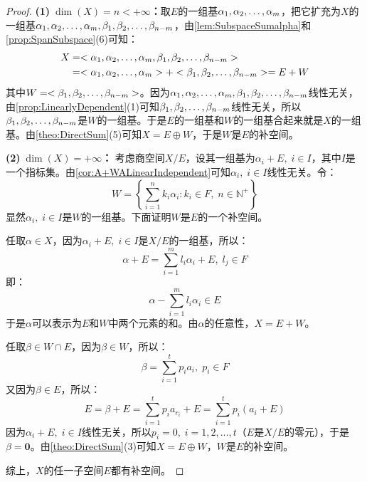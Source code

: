 \begin{proof}
	\textbf{(1)$\;\dim(X)=n<+\infty$：}取$E$的一组基$\alpha_1, \alpha_2, \dots, \alpha_{m}$，把它扩充为$X$的一组基$\alpha_1, \alpha_2, \dots, \alpha_{m},\beta_1, \beta_2, \dots, \beta_{n-m}$，由\cref{lem:SubspaceSumalpha}和\cref{prop:SpanSubspace}(6)可知：
	\begin{align*}
		X
		&=<\alpha_1, \alpha_2, \dots, \alpha_{m},\beta_1, \beta_2, \dots, \beta_{n-m}> \\
		&=<\alpha_1, \alpha_2, \dots, \alpha_{m}>+<\beta_1, \beta_2, \dots, \beta_{n-m}>=E+W
	\end{align*}
	其中$W=<\beta_1, \beta_2, \dots, \beta_{n-m}>$。因为$\alpha_1, \alpha_2, \dots, \alpha_{m},\beta_1, \beta_2, \dots, \beta_{n-m}$线性无关，由\cref{prop:LinearlyDependent}(1)可知$\beta_1, \beta_2, \dots, \beta_{n-m}$线性无关，所以$\beta_1, \beta_2, \dots, \beta_{n-m}$是$W$的一组基。于是$E$的一组基和$W$的一组基合起来就是$X$的一组基。由\cref{theo:DirectSum}(5)可知$X=E\oplus W$，于是$W$是$E$的补空间。\par
	\textbf{(2)$\;\dim(X)=+\infty$：}
	考虑商空间$X/E$，设其一组基为$\alpha_i+E,\;i\in I$，其中$I$是一个指标集。由\cref{cor:A+WALinearIndependent}可知$\alpha_i,\;i\in I$线性无关。令：
	\begin{equation*}
		W=\left\{\sum_{i=1}^{n}k_i\alpha_{i}:k_i\in F,\;n\in\mathbb{N}^+\right\}
	\end{equation*}
	显然$\alpha_i,\;i\in I$是$W$的一组基。下面证明$W$是$E$的一个补空间。\par
	任取$\alpha\in X$，因为$\alpha_i+E,\;i\in I$是$X/E$的一组基，所以：
	\begin{equation*}
		\alpha+E=\sum_{i=1}^{m}l_i\alpha_{i}+E,\;l_j\in F
	\end{equation*}
	即：
	\begin{equation*}
		\alpha-\sum_{i=1}^{m}l_i\alpha_{i}\in E
	\end{equation*}
	于是$\alpha$可以表示为$E$和$W$中两个元素的和。由$\alpha$的任意性，$X=E+W$。\par
	任取$\beta\in W\cap E$，因为$\beta\in W$，所以：
	\begin{equation*}
		\beta=\sum_{i=1}^{t}p_ia_{i},\;p_i\in F
	\end{equation*}
	又因为$\beta\in E$，所以：
	\begin{equation*}
		E=\beta+E=\sum_{i=1}^{t}p_ia_{r_i}+E=\sum_{i=1}^{t}p_i(a_{i}+E)
	\end{equation*}
	因为$\alpha_i+E,\;i\in I$线性无关，所以$p_i=0,\;i=1,2,\dots,t$（$E$是$X/E$的零元），于是$\beta=\mathbf{0}$。由\cref{theo:DirectSum}(3)可知$X=E\oplus W$，$W$是$E$的补空间。\par
	综上，$X$的任一子空间$E$都有补空间。
\end{proof}


